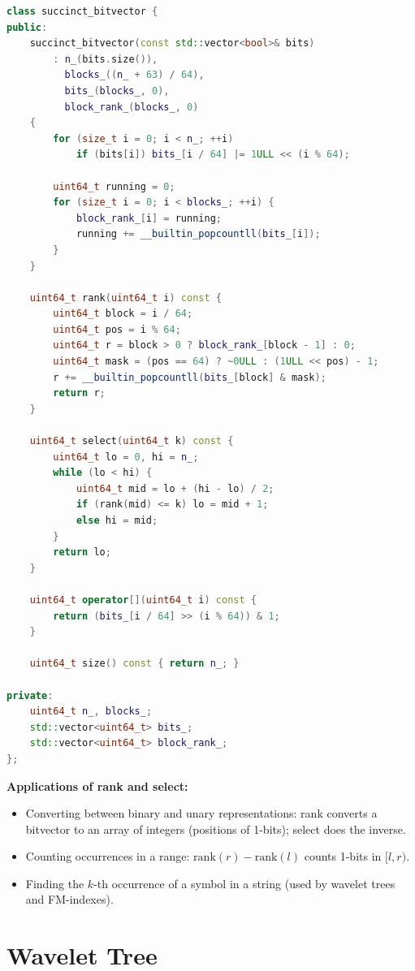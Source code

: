 \begin{lstlisting}[language=C++]
class succinct_bitvector {
public:
    succinct_bitvector(const std::vector<bool>& bits)
        : n_(bits.size()),
          blocks_((n_ + 63) / 64),
          bits_(blocks_, 0),
          block_rank_(blocks_, 0)
    {
        for (size_t i = 0; i < n_; ++i)
            if (bits[i]) bits_[i / 64] |= 1ULL << (i % 64);

        uint64_t running = 0;
        for (size_t i = 0; i < blocks_; ++i) {
            block_rank_[i] = running;
            running += __builtin_popcountll(bits_[i]);
        }
    }

    uint64_t rank(uint64_t i) const {
        uint64_t block = i / 64;
        uint64_t pos = i % 64;
        uint64_t r = block > 0 ? block_rank_[block - 1] : 0;
        uint64_t mask = (pos == 64) ? ~0ULL : (1ULL << pos) - 1;
        r += __builtin_popcountll(bits_[block] & mask);
        return r;
    }

    uint64_t select(uint64_t k) const {
        uint64_t lo = 0, hi = n_;
        while (lo < hi) {
            uint64_t mid = lo + (hi - lo) / 2;
            if (rank(mid) <= k) lo = mid + 1;
            else hi = mid;
        }
        return lo;
    }

    uint64_t operator[](uint64_t i) const {
        return (bits_[i / 64] >> (i % 64)) & 1;
    }

    uint64_t size() const { return n_; }

private:
    uint64_t n_, blocks_;
    std::vector<uint64_t> bits_;
    std::vector<uint64_t> block_rank_;
};
\end{lstlisting}

\textbf{Applications of rank and select:}
\begin{itemize}
\item Converting between binary and unary representations: rank converts a bitvector to an array of integers (positions of 1-bits); select does the inverse.
\item Counting occurrences in a range: $\text{rank}(r) - \text{rank}(l)$ counts 1-bits in $[l, r)$.
\item Finding the $k$-th occurrence of a symbol in a string (used by wavelet trees and FM-indexes).
\end{itemize}

\section{Wavelet Tree}\label{sec22:wavelet-tree}

